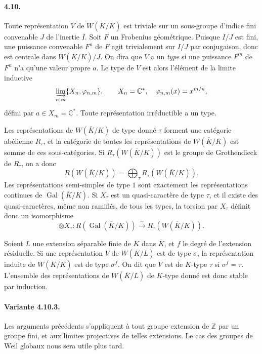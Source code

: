\documentclass[10pt]{article}
\newcommand{\C}{\mathbb C}
\newcommand{\Z}{\mathbb Z}
\newcommand{\Gal}{\operatorname{Gal}}
\newcommand{\iso}{\xrightarrow{\sim}}
\providecommand{\Gal}{\operatorname{Gal}}
\providecommand{\Gal}{\operatorname{Gal}}
\providecommand{\Gal}{\operatorname{Gal}}
\providecommand{\Gal}{\operatorname{Gal}}
\begin{document}
\paragraph{4.10.} Toute représentation \(V\) de \(W(\overline K/K)\) est triviale sur un sous-groupe d'indice fini convenable \(J\) de l'inertie \(I\). Soit \(F\) un Frobenius géométrique. Puisque \(I/J\) est fini, une puissance convenable \(F^n\) de \(F\) agit trivialement sur \(I/J\) par conjugaison, donc est centrale dans \(W(\overline K/K)/J\). On dira que \(V\) a un \emph{type} si une puissance \(F^m\) de \(F^n\) n'a qu'une valeur propre \(a\). Le type de \(V\) est alors l'élément de la limite inductive
\[
\varinjlim_{n\mid m}\{X_n,\varphi_{n,m}\},\qquad
X_n=\C^*,\quad \varphi_{n,m}(x)=x^{m/n},
\]
défini par \(a\in X_m=\C^*\). Toute représentation irréductible a un type.

Les représentations de \(W(\overline K/K)\) de type donné \(\tau\) forment une catégorie abélienne \(R_\tau\), et la catégorie de toutes les représentations de \(W(\overline K/K)\) est somme de ces sous-catégories. Si \(R_\tau(W(\overline K/K))\) est le groupe de Grothendieck de \(R_\tau\), on a donc
\[
\tag{4.10.1}
R(W(\overline K/K))=\bigoplus_\tau R_\tau(W(\overline K/K)).
\]
Les représentations semi-simples de type \(1\) sont exactement les représentations continues de \(\Gal(\overline K/K)\). Si \(X_\tau\) est un quasi-caractère de type \(\tau\), et il existe des quasi-caractères, même non ramifiés, de tous les types, la torsion par \(X_\tau\) définit donc un isomorphisme
\[
\tag{4.10.2}
\otimes X_\tau:R(\Gal(\overline K/K))\iso R_\tau(W(\overline K/K)).
\]

Soient \(L\) une extension séparable finie de \(K\) dans \(\overline K\), et \(f\) le degré de l'extension résiduelle. Si une représentation \(V\) de \(W(\overline K/L)\) est de type \(\sigma\), la représentation induite de \(W(\overline K/K)\) est de type \(\sigma^f\). On dit que \(V\) est de \(K\)-type \(\tau\) si \(\sigma^f=\tau\). L'ensemble des représentations de \(W(\overline K/L)\) de \(K\)-type donné est donc stable par induction.

\paragraph{Variante 4.10.3.} Les arguments précédents s'appliquent à tout groupe extension de \(\Z\) par un groupe fini, et aux limites projectives de telles extensions. Le cas des groupes de Weil globaux nous sera utile plus tard.
\end{document}
